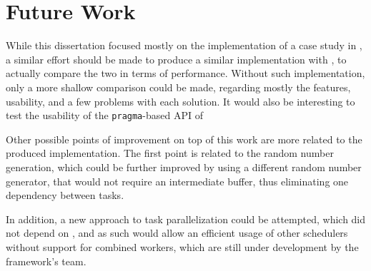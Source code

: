 \documentclass[main.tex]{subfiles}
\begin{document}
\section{Future Work} \label{chapter:future}

While this dissertation focused mostly on the implementation of a case study in \starpu, a similar effort should be made to produce a similar implementation with \gama, to actually compare the two in terms of performance. Without such implementation, only a more shallow comparison could be made, regarding mostly the features, usability, and a few problems with each solution.
It would also be interesting to test the usability of the \texttt{pragma}-based API of \starpu

Other possible points of improvement on top of this work are more related to the produced implementation. The first point is related to the random number generation, which could be further improved by using a different random number generator, that would not require an intermediate buffer, thus eliminating one dependency between tasks.

In addition, a new approach to task parallelization could be attempted, which did not depend on \openmp, and as such would allow an efficient usage of other \starpu schedulers without support for combined workers, which are still under development by the framework's team.
\end{document}
